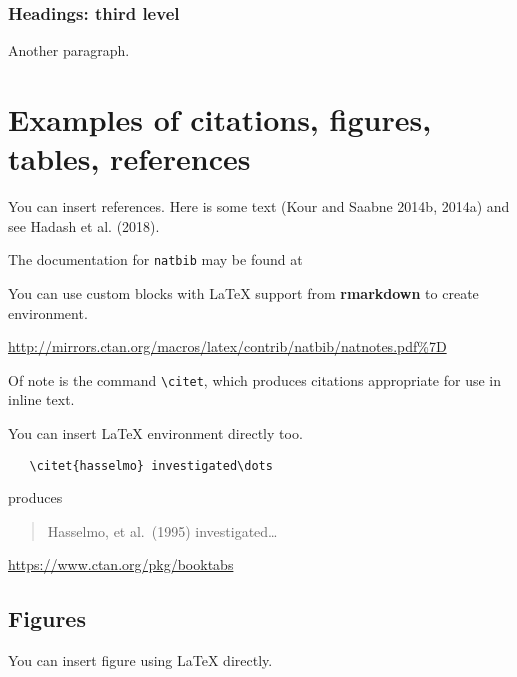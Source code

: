 \documentclass{article}
\begin{document}
\hypertarget{headings-third-level}{%
\subsubsection{Headings: third level}\label{headings-third-level}}

Another paragraph.

\hypertarget{examples-of-citations-figures-tables-references}{%
\section{Examples of citations, figures, tables,
references}\label{examples-of-citations-figures-tables-references}}

\label{sec:others}

You can insert references. Here is some text (Kour and Saabne 2014b,
2014a) and see Hadash et al. (2018).

The documentation for \verb+natbib+ may be found at

You can use custom blocks with LaTeX support from \textbf{rmarkdown} to
create environment.

\begin{center}
\url{http://mirrors.ctan.org/macros/latex/contrib/natbib/natnotes.pdf\%7D}

\end{center}

Of note is the command \verb+\citet+, which produces citations
appropriate for use in inline text.

You can insert LaTeX environment directly too.

\begin{verbatim}
   \citet{hasselmo} investigated\dots
\end{verbatim}

produces

\begin{quote}
  Hasselmo, et al.\ (1995) investigated\dots
\end{quote}

\begin{center}
  \url{https://www.ctan.org/pkg/booktabs}
\end{center}

\hypertarget{figures}{%
\subsection{Figures}\label{figures}}

You can insert figure using LaTeX directly.
\end{document}
